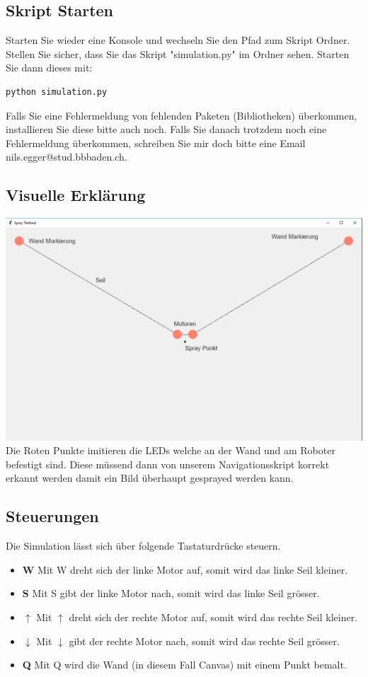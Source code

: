\documentclass[12pt]{article}
\begin{document}
\subsection{Skript Starten}
Starten Sie wieder eine Konsole und wechseln Sie den Pfad zum Skript Ordner. Stellen Sie sicher, dass Sie das Skript "simulation.py" im Ordner sehen. Starten Sie dann dieses mit:
\begin{lstlisting}
python simulation.py
\end{lstlisting}
Falls Sie eine Fehlermeldung von fehlenden Paketen (Bibliotheken) überkommen, installieren Sie diese bitte auch noch. Falls Sie danach trotzdem noch eine Fehlermeldung überkommen, schreiben Sie mir doch bitte eine Email \newline nils.egger@stud.bbbaden.ch.
\subsection{Visuelle Erklärung}
\includegraphics[width=1\textwidth]{simulation_visuelle_erklaerung.PNG}
Die Roten Punkte imitieren die LEDs welche an der Wand und am Roboter befestigt sind. Diese müssend dann von unserem Navigationsskript korrekt erkannt werden damit ein Bild überhaupt gesprayed werden kann.
\subsection{Steuerungen}
Die Simulation lässt sich über folgende Tastaturdrücke steuern.
\begin{itemize}
	\item \textbf{W} \newline
	Mit W dreht sich der linke Motor auf, somit wird das linke Seil kleiner.
	\item \textbf{S} \newline
	Mit S gibt der linke Motor nach, somit wird das linke Seil grösser.
	\item \textbf{$\uparrow$} \newline
	Mit $\uparrow$ dreht sich der rechte Motor auf, somit wird das rechte Seil kleiner.
	\item \textbf{$\downarrow$} \newline
	Mit $\downarrow$ gibt der rechte Motor nach, somit wird das rechte Seil grösser.
	\item \textbf{Q} \newline
	Mit Q wird die Wand (in diesem Fall Canvas) mit einem Punkt bemalt.
\end{itemize}
\end{document}
